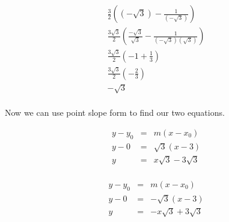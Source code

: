 \documentclass[11pt]{exam}
\begin{document}
\begin{minipage}{.5\linewidth}
	\begin{eqnarray*}
  		\frac{3}{2}\left(( -\sqrt{3} )-\frac{1}{( -\sqrt{3} )}\right) \\ 
  		\frac{3 \sqrt{3} }{2}\left( \frac{ -\sqrt{3} }{ \sqrt{3} } -\frac{1}{( -\sqrt{3}) (\sqrt{3} )}\right) \\
  		\frac{3 \sqrt{3} }{2}\left( -1 +\frac{1}{3} \right) \\
  		\frac{3 \sqrt{3} }{2}\left( -\frac{2}{3} \right) \\
  		-\sqrt{3}\\
	\end{eqnarray*}
\end{minipage}



\noindent Now we can use point slope form to find our two equations.\\
\noindent
\begin{minipage}{.5\linewidth}
	\begin{eqnarray*}
		y - y_0 &=& m(x-x_0) \\
		y - 0 &=& \sqrt{3}(x-3) \\
		y &=& x\sqrt{3}-3\sqrt{3} \\
	\end{eqnarray*}
\end{minipage}
\begin{minipage}{.5\linewidth}
	\begin{eqnarray*}
		y - y_0 &=& m(x-x_0) \\
		y - 0 &=& -\sqrt{3}(x-3) \\
		y &=& -x\sqrt{3}+3\sqrt{3} \\
	\end{eqnarray*}
\end{minipage}
\end{document}
